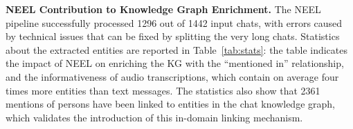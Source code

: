


\textbf{NEEL Contribution to Knowledge Graph Enrichment.} The NEEL pipeline successfully processed 1296 out of 1442 input chats, with errors caused by technical issues that can be fixed by splitting the very long chats. Statistics about the extracted entities are reported in Table~\ref{tab:stats}: the table indicates the impact of NEEL on enriching the KG with the ``mentioned in'' relationship, 
and the informativeness of audio transcriptions, which contain on average four times more entities than text messages. %
The statistics also show that 2361 mentions of persons have been linked to entities in the chat knowledge graph, which validates the introduction of this in-domain linking mechanism.

